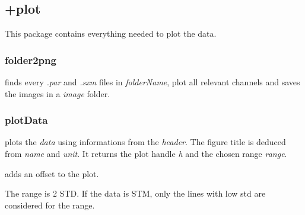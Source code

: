 %
%
%
%

\subsection{+plot}
This package contains everything needed to plot the data.

\subsubsection{folder2png} 
\bdf
{} finds every \emph{.par} and \emph{.sxm} files in \emph{folderName}, plot all relevant channels and saves the images in a \emph{image} folder.
\edf
\subsubsection{plotData}
\bdf
{} plots the \emph{data} using informations from the \emph{header}. The figure title is deduced from \emph{name} and \emph{unit}. It returns the plot handle \emph{h} and the chosen range \emph{range}.
 
 adds an offset to the plot.
\edf

The range is 2 STD. If the data is STM, only the lines with low std are considered for the range.
